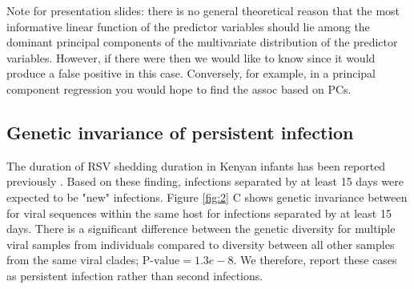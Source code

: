 \documentclass{article}
\begin{document}
Note for presentation slides: there is no general theoretical reason that the most informative linear function of the predictor variables should lie among the dominant principal components of the multivariate distribution of the predictor variables. However, if there were then we would like to know since it would produce a false positive in this case. Conversely, for example, in a principal component regression you would hope to find the assoc based on PCs.

\subsection{Genetic invariance of persistent infection}
The duration of RSV shedding duration in Kenyan infants has been reported previously
\cite{okiro2010duration}.
Based on these finding, infections separated by at least 15 days were expected to be "new" infections. 
Figure \ref{fig:2} C
shows genetic invariance between for viral sequences within the same host for infections separated by at least 15 days. 
There is a significant difference between the genetic diversity for multiple viral samples from individuals compared to diversity between all other samples from the same viral clades; $\text{P-value} = 1.3e-8$.
We therefore, report these cases as persistent infection rather than second infections.
\end{document}
